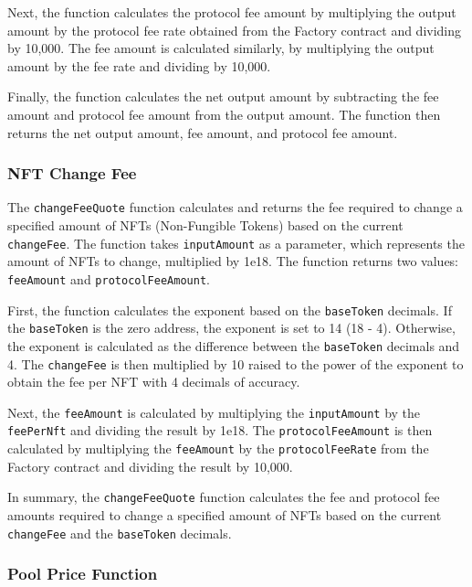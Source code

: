 Next, the function calculates the protocol fee amount by multiplying the
output amount by the protocol fee rate obtained from the Factory
contract and dividing by 10,000. The fee amount is calculated similarly,
by multiplying the output amount by the fee rate and dividing by 10,000.

Finally, the function calculates the net output amount by subtracting
the fee amount and protocol fee amount from the output amount. The
function then returns the net output amount, fee amount, and protocol
fee amount.

\hypertarget{nft-change-fee}{%
\subsubsection{NFT Change Fee}\label{nft-change-fee}}

The \texttt{changeFeeQuote} function calculates and returns the fee
required to change a specified amount of NFTs (Non-Fungible Tokens)
based on the current \texttt{changeFee}. The function takes
\texttt{inputAmount} as a parameter, which represents the amount of NFTs
to change, multiplied by 1e18. The function returns two values:
\texttt{feeAmount} and \texttt{protocolFeeAmount}.

First, the function calculates the exponent based on the
\texttt{baseToken} decimals. If the \texttt{baseToken} is the zero
address, the exponent is set to 14 (18 - 4). Otherwise, the exponent is
calculated as the difference between the \texttt{baseToken} decimals and
4. The \texttt{changeFee} is then multiplied by 10 raised to the power
of the exponent to obtain the fee per NFT with 4 decimals of accuracy.

Next, the \texttt{feeAmount} is calculated by multiplying the
\texttt{inputAmount} by the \texttt{feePerNft} and dividing the result
by 1e18. The \texttt{protocolFeeAmount} is then calculated by
multiplying the \texttt{feeAmount} by the \texttt{protocolFeeRate} from
the Factory contract and dividing the result by 10,000.

In summary, the \texttt{changeFeeQuote} function calculates the fee and
protocol fee amounts required to change a specified amount of NFTs based
on the current \texttt{changeFee} and the \texttt{baseToken} decimals.

\hypertarget{pool-price-function}{%
\subsubsection{Pool Price Function}\label{pool-price-function}}

